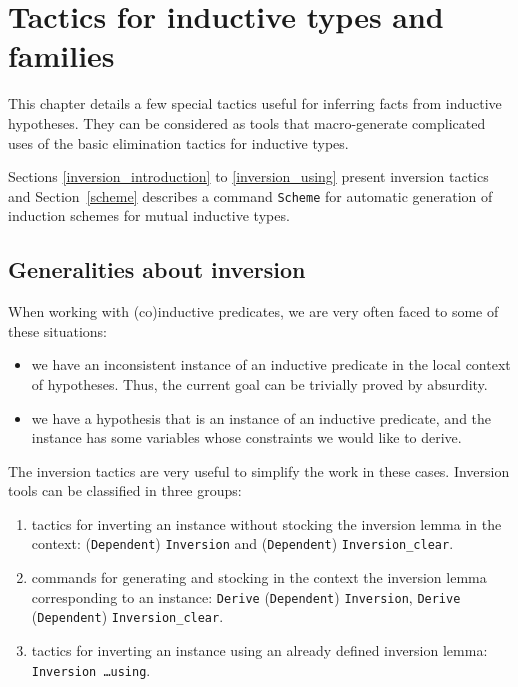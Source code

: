 
%

%

%


\chapter[Tactics for inductive types and families]{Tactics for inductive types and families\label{Addoc-equality}}

This chapter details a few special tactics useful for inferring facts
from inductive hypotheses. They can be considered as tools that
macro-generate complicated uses of the basic elimination tactics for
inductive types. 

Sections \ref{inversion_introduction} to \ref{inversion_using}  present
inversion tactics and Section~\ref{scheme} describes
a command {\tt Scheme} for automatic generation of induction schemes
for mutual inductive types.

%
%

%

\section[Generalities about inversion]{Generalities about inversion\label{inversion_introduction}}
When working with (co)inductive predicates, we are very often faced to
some of these situations:
\begin{itemize}
\item we have an inconsistent instance of an inductive predicate in the
  local context of hypotheses. Thus, the current goal can be trivially
  proved by absurdity. 

\item we have a hypothesis that is an instance of an inductive
  predicate, and the instance has some variables whose constraints we
  would like to derive.
\end{itemize}

The inversion tactics are very useful to simplify the work in these
cases. Inversion tools can be classified in three groups:
\begin{enumerate}
\item tactics for inverting an instance without stocking the inversion
  lemma in the context: 
  (\texttt{Dependent})  \texttt{Inversion} and
 (\texttt{Dependent}) \texttt{Inversion\_clear}.
\item commands for generating and stocking in the context the inversion
  lemma corresponding to an instance: \texttt{Derive}
  (\texttt{Dependent}) \texttt{Inversion}, \texttt{Derive}
  (\texttt{Dependent}) \texttt{Inversion\_clear}.
\item tactics for inverting an instance using an already defined
  inversion lemma: \texttt{Inversion \ldots using}.
\end{enumerate}


